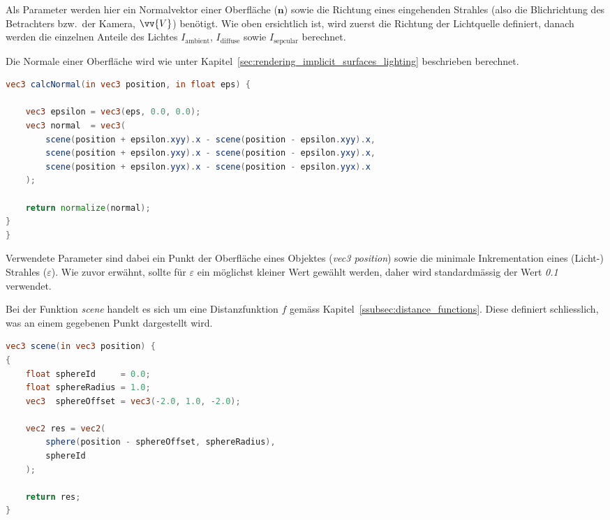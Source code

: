 Als Parameter werden hier ein Normalvektor einer Oberfläche ($\bm{n}$)
sowie die Richtung eines eingehenden Strahles (also die Blichrichtung
des Betrachters bzw.\ der Kamera, $\vv{V}$) benötigt.
Wie oben ersichtlich ist, wird zuerst die Richtung der Lichtquelle definiert,
danach werden die einzelnen Anteile des Lichtes $I_{\text{ambient}}$,
$I_{\text{diffuse}}$ sowie $I_{\text{sepcular}}$ berechnet.

Die Normale einer Oberfläche wird wie unter
Kapitel~\ref{sec:rendering_implicit_surfaces_lighting} beschrieben
berechnet.

\begin{lstlisting}[language=GLSL,caption={Berechnung der Normalen einer
        impliziten Oberfläche in
        GLSL.},label={alg:glsl_normal},captionpos=b,emph={calcNormal}]
vec3 calcNormal(in vec3 position, in float eps) {

    vec3 epsilon = vec3(eps, 0.0, 0.0);
    vec3 normal  = vec3(
        scene(position + epsilon.xyy).x - scene(position - epsilon.xyy).x,
        scene(position + epsilon.yxy).x - scene(position - epsilon.yxy).x,
        scene(position + epsilon.yyx).x - scene(position - epsilon.yyx).x
    );

    return normalize(normal);
}
}
\end{lstlisting}

Verwendete Parameter sind dabei ein Punkt der Oberfläche eines Objektes
(\textit{vec3 position}) sowie die minimale Inkrementation eines
(Licht-) Strahles ($\varepsilon$). Wie zuvor erwähnt, sollte
für $\varepsilon$ ein möglichst kleiner Wert gewählt werden, daher wird
standardmässig der Wert \textit{0.1} verwendet.

Bei der Funktion \textit{scene} handelt es sich um eine Distanzfunktion
$f$ gemäss Kapitel~\ref{ssubsec:distance_functions}. Diese definiert
schliesslich, was an einem gegebenen Punkt dargestellt wird.

\begin{lstlisting}[language=GLSL,caption={Distanzfunktion $f$ in
        GLSL.},label={alg:glsl_distance_func},captionpos=b,emph={scene}]
vec3 scene(in vec3 position) {
{
    float sphereId     = 0.0;
    float sphereRadius = 1.0;
    vec3  sphereOffset = vec3(-2.0, 1.0, -2.0);

    vec2 res = vec2(
        sphere(position - sphereOffset, sphereRadius),
        sphereId
    );

    return res;
}
\end{lstlisting}

